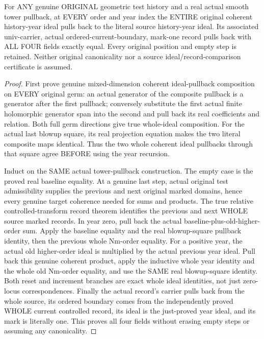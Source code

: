 \begin{theorem}
\label{hir:original-coherent-entire-test-history-year-smooth-pullback}
\leanok
For ANY genuine ORIGINAL geometric test history and a real actual smooth
tower pullback, at EVERY order and year index the ENTIRE original coherent
history-year ideal pulls back to the literal source history-year ideal.
Its associated univ-carrier, actual ordered-current-boundary, mark-one
record pulls back with ALL FOUR fields exactly equal. Every original
position and empty step is retained. Neither original canonicality nor a
source ideal/record-comparison certificate is assumed.
\end{theorem}
\begin{proof}
First prove genuine mixed-dimension coherent ideal-pullback composition
on EVERY original germ: an actual generator of the composite pullback is
a generator after the first pullback; conversely substitute the first
actual finite holomorphic generator span into the second and pull back
its real coefficients and relation. Both full germ directions give true
whole-ideal composition. For the actual last blowup square, its real
projection equation makes the two literal composite maps identical.
Thus the two whole coherent ideal pullbacks through that square agree
BEFORE using the year recursion.

Induct on the SAME actual tower-pullback construction. The empty case
is the proved real baseline equality. At a genuine last step, actual
original test admissibility supplies the previous and next original
marked domains, hence every genuine target coherence needed for sums
and products. The true relative controlled-transform record theorem
identifies the previous and next WHOLE source marked records. In year
zero, pull back the actual baseline-plus-old-higher-order sum. Apply the
baseline equality and the real blowup-square pullback identity, then the
previous whole Nm-order equality. For a positive year, the actual old
higher-order ideal is multiplied by the actual previous year ideal.
Pull back this genuine coherent product, apply the inductive whole year
identity and the whole old Nm-order equality, and use the SAME real
blowup-square identity. Both reset and increment branches are exact
whole ideal identities, not just zero-locus correspondences. Finally the
actual record's carrier pulls back from the whole source, its ordered
boundary comes from the independently proved WHOLE current controlled
record, its ideal is the just-proved year ideal, and its mark is literally
one. This proves all four fields without erasing empty steps or assuming
any canonicality.
\end{proof}

